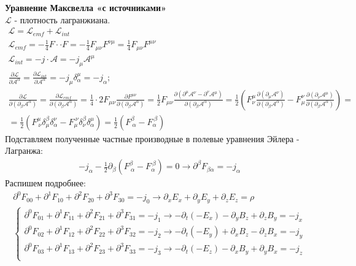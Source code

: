 \textbf{Уравнение Максвелла «с источниками»}\\
$\mathcal L$ - плотность лагранжиана. 
\begin{gather*}
\mathcal L = \mathcal L_{emf} + \mathcal L_{int}\\
\mathcal L_{emf} = -\frac{1}{4} F \cdot\cdot F = -\frac{1}{4}F_{\mu \nu}F^{\nu\mu} = \frac{1}{4}F_{\mu\nu}F^{\mu\nu}\\
\mathcal L_{int} = -j \cdot \mathcal A = -j_\mu \mathcal A^\mu\\
\frac{\partial\mathcal L}{\partial \mathcal A^\alpha} = \frac{\partial\mathcal L_{int}}{\partial \mathcal A^\alpha} = -j_\mu \delta_\alpha^\mu = -j_\alpha;\\
\frac{\partial \mathcal L}{\partial(\partial_\beta \mathcal A^\alpha)} = \frac{\partial \mathcal L_{emf}}{\partial(\partial_\beta\mathcal A^\alpha)} = \frac{1}{4} \cdot 2F_{\mu\nu}\frac{\partial F^{\mu \nu}}{\partial(\partial_\beta \mathcal A^\alpha)} = \frac{1}{2}F_{\mu\nu}\frac{\partial(\partial^\mu\mathcal A^\nu - \partial^\nu \mathcal A^\mu)}{\partial(\partial_\beta \mathcal A^\alpha)} = \frac{1}{2}\left(F^\mu_\nu\frac{\partial(\partial_\mu\mathcal A^\nu)}{\partial(\partial_\beta \mathcal A^\alpha)} - F^\nu_\mu\frac{\partial(\partial_\nu\mathcal A^\mu)}{\partial(\partial_\beta \mathcal A^\alpha)}\right) =\\ =  \frac{1}{2} \left( F^\mu_{\ \nu} \delta^\beta_\mu \delta^\nu_\alpha - F^{\ \nu}_\mu \delta^\beta_\nu \delta^\mu_\alpha \right) = \frac{1}{2} \left(F^\beta_{\ \alpha} - F^{\ \beta}_\alpha\right)
\end{gather*}
Подставляем полученные частные производные в полевые уравнения Эйлера - Лагранжа:
\begin{gather*}
-j_\alpha - \frac{1}{2} \partial_\beta\left(F^\beta_{\ \alpha} - F_\alpha^{\ \beta}\right) = 0 \rightarrow \partial^\beta F_{\beta\alpha} = -j_\alpha
\end{gather*}
Распишем подробнее:
\begin{gather*}
\partial^0F_{00} + \partial^1F_{10} + \partial^2 F_{20} + \partial^3F_{30} = -j_0 \rightarrow \partial_x E_x + \partial_y E_y + \partial_z E_z = \rho\\
\begin{cases}
\partial^0F_{01} + \partial^1F_{11} + \partial^2 F_{21} + \partial^3F_{31} = -j_1 \rightarrow -\partial_t(- E_x) - \partial_y B_z + \partial_z B_y = -j_x\\
\partial^0F_{02} + \partial^1F_{12} + \partial^2 F_{22} + \partial^3F_{32} = -j_2 \rightarrow -\partial_t(- E_y) + \partial_x B_z - \partial_z B_x = -j_y\\
\partial^0F_{03} + \partial^1F_{13} + \partial^2 F_{23} + \partial^3F_{33} = -j_3 \rightarrow -\partial_t(- E_z) - \partial_x B_y + \partial_y B_x = -j_z\\
\end{cases}
\end{gather*}
